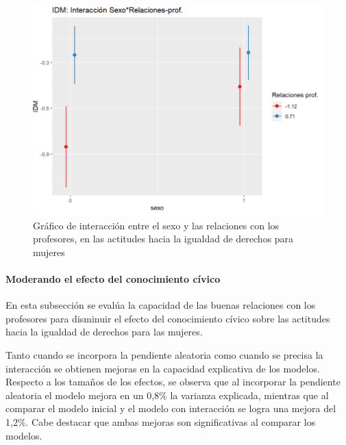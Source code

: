 \documentclass[12pt,twoside]{templates/facsothesis}
\begin{document}
\begin{figure}[H]

{\centering \includegraphics[width=1\linewidth]{input/images/PLOTINT1} 

}

\caption{Gráfico de interacción entre el sexo y las relaciones con los profesores, en las actitudes hacia la igualdad de derechos para mujeres}\label{fig:unnamed-chunk-12}
\end{figure}

\newpage

\hypertarget{moderando-el-efecto-del-conocimiento-cuxedvico}{%
\paragraph{Moderando el efecto del conocimiento cívico}\label{moderando-el-efecto-del-conocimiento-cuxedvico}}

En esta subsección se evalúa la capacidad de las buenas relaciones con los profesores para disminuir el efecto del conocimiento cívico sobre las actitudes hacia la igualdad de derechos para las mujeres.

Tanto cuando se incorpora la pendiente aleatoria como cuando se precisa la interacción se obtienen mejoras en la capacidad explicativa de los modelos. Respecto a los tamaños de los efectos, se observa que al incorporar la pendiente aleatoria el modelo mejora en un 0,8\% la varianza explicada, mientras que al comparar el modelo inicial y el modelo con interacción se logra una mejora del 1,2\%. Cabe destacar que ambas mejoras son significativas al comparar los modelos.
\end{document}
